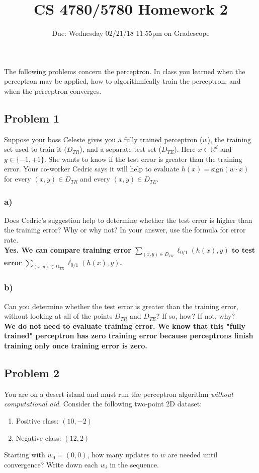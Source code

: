 \documentclass[a4paper]{article}
\title{CS 4780/5780 Homework 2}
\author{Due: Wednesday 02/21/18 11:55pm on Gradescope}
\date{}
\begin{document}
\maketitle

The following problems concern the perceptron. In class you learned when the perceptron may be applied, how to algorithmically train the perceptron, and when the perceptron converges.

\subsection*{Problem 1}
Suppose your boss Celeste gives you a fully trained perceptron ($w$), the training set used to train it ($D_{TR}$), and a separate test set ($D_{TE}$). Here $x\in\mathbb{R}^d$ and $y\in\{-1,+1\}$. She wants to know if the test error is greater than the training error. Your co-worker Cedric says it will help to evaluate $h(x)=\text{sign}(w\cdot x)$ for every $(x,y)\in D_{TR}$ and every $(x,y)\in D_{TE}$.
\subsubsection*{a)}
Does Cedric's suggestion help to determine whether the test error is higher than the training error? Why or why not? In your answer, use the formula for error rate.\\

\textbf{Yes. We can compare training error $\sum_{(x,y)\in D_{TR}} \ell_{0/1}(h(x),y)$ to test error $\sum_{(x,y)\in D_{TR}} \ell_{0/1}(h(x),y)$.}

\subsubsection*{b)}
Can you determine whether the test error is greater than the training error, without looking at all of the points $D_{TR}$ and $D_{TE}$? If so, how? If not, why?\\

\textbf{We do not need to evaluate training error. We know that this "fully trained" perceptron has zero training error because perceptrons finish training only once training error is zero.}

\subsection*{Problem 2}
You are on a desert island and must run the perceptron algorithm \textit{without computational aid}. Consider the following two-point 2D dataset:
\begin{enumerate}
\item Positive class: $(10, -2)$
\item Negative class: $(12, 2)$
\end{enumerate}
Starting with $w_0=(0,0)$, how many updates to $w$ are needed until convergence? Write down each $w_i$ in the sequence.\\
\end{document}

